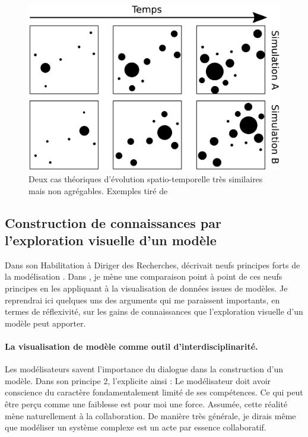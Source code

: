 \begin{figure}[H]
	\centering
	\includegraphics[width=.8\linewidth]{img/espace_theoriques.pdf}
	\caption[Deux cas théoriques d'évolution spatio-temporelle très similaires mais non agrégables.]{Deux cas théoriques d'évolution spatio-temporelle très similaires mais non agrégables. Exemples tiré de \textcite{cura_visualisation_2020} }
	\label{subfig:agreg-espace}
\end{figure}


\subsection{Construction de connaissances par l'exploration visuelle d'un modèle \label{subsec:construction-connaissance-explo}}


Dans son Habilitation à Diriger des Recherches,  décrivait neufs \og principes forts\fg{} de la modélisation \autocite[76--84]{banos_pour_2013}.
Dans \textcite{cura_visualisation_2020}, je mène une comparaison point à point de ces neufs principes en les appliquant à la visualisation de données issues de modèles.
Je reprendrai ici quelques uns des arguments qui me paraissent importants, en termes de réflexivité, sur les gains de connaissances que l'exploration visuelle d'un modèle peut apporter.

\paragraph{La visualisation de modèle comme outil d'interdisciplinarité.}
Les modélisateurs savent l'importance du dialogue dans la construction d'un modèle.
Dans son principe 2, \textcite[77]{banos_pour_2013} l'explicite ainsi :
	\og Le modélisateur doit avoir conscience du caractère fondamentalement limité de ses compétences.
	Ce qui peut être perçu comme une faiblesse est pour moi une force.
	Assumée, cette réalité mène naturellement à la collaboration.
	De manière très générale, je dirais même que modéliser un système complexe est un acte par essence collaboratif\fg{}.

